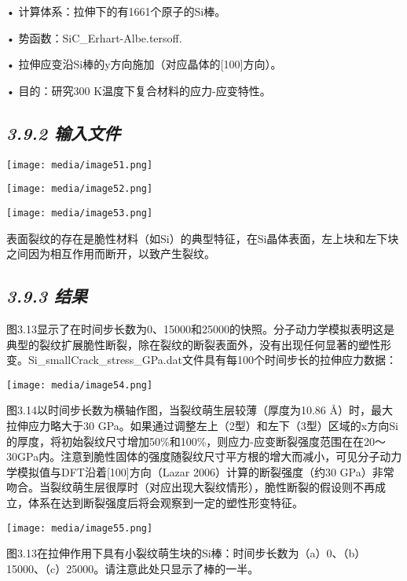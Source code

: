 \documentclass[
]{article}
\begin{document}
• 计算体系：拉伸下的有1661个原子的Si棒。

• 势函数：SiC\_Erhart-Albe.tersoff.

• 拉伸应变沿Si棒的y方向施加（对应晶体的{[}100{]}方向）。

• 目的：研究300 K温度下复合材料的应力-应变特性。

\hypertarget{ux8f93ux5165ux6587ux4ef6-7}{%
\subsection{\texorpdfstring{\emph{3.9.2
输入文件}}{3.9.2 输入文件}}\label{ux8f93ux5165ux6587ux4ef6-7}}

\texttt{[image: media/image51.png]}

\texttt{[image: media/image52.png]}

\texttt{[image: media/image53.png]}

表面裂纹的存在是脆性材料（如Si）的典型特征，在Si晶体表面，左上块和左下块之间因为相互作用而断开，以致产生裂纹。

\hypertarget{ux7ed3ux679c-8}{%
\subsection{\texorpdfstring{\emph{3.9.3
结果}}{3.9.3 结果}}\label{ux7ed3ux679c-8}}

图3.13显示了在时间步长数为0、15000和25000的快照。分子动力学模拟表明这是典型的裂纹扩展脆性断裂，除在裂纹的断裂表面外，没有出现任何显著的塑性形变。Si\_smallCrack\_stress\_GPa.dat文件具有每100个时间步长的拉伸应力数据：

\texttt{[image: media/image54.png]}

图3.14以时间步长数为横轴作图，当裂纹萌生层较薄（厚度为10.86
Å）时，最大拉伸应力略大于30
GPa。如果通过调整左上（2型）和左下（3型）区域的x方向Si的厚度，将初始裂纹尺寸增加50\%和100\%，则应力-应变断裂强度范围在在20～30GPa内。注意到脆性固体的强度随裂纹尺寸平方根的增大而减小，可见分子动力学模拟值与DFT沿着{[}100{]}方向（Lazar
2006）计算的断裂强度（约30
GPa）非常吻合。当裂纹萌生层很厚时（对应出现大裂纹情形），脆性断裂的假设则不再成立，体系在达到断裂强度后将会观察到一定的塑性形变特征。

\texttt{[image: media/image55.png]}

图3.13在拉伸作用下具有小裂纹萌生块的Si棒：时间步长数为（a）0、（b）15000、（c）25000。请注意此处只显示了棒的一半。
\end{document}
